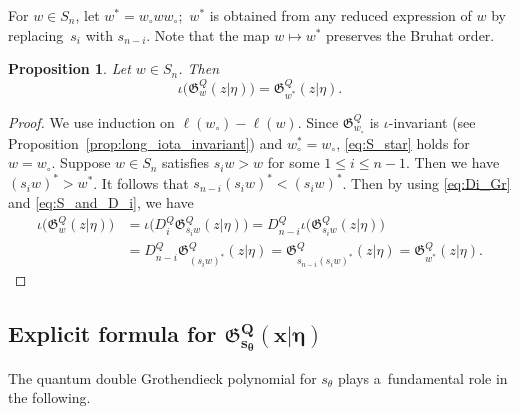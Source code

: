 \documentclass[pdftex]{sigma}
\numberwithin{equation}{section}
\newcommand{\Gro}[1]{\mathfrak{G}^Q_{#1}}
\newtheorem{Proposition}[Theorem]{Proposition}
\theoremstyle{definition}
\begin{document}
For $w\in S_n$, let
$w^*=w_\circ w w_\circ;$
$w^*$ is obtained from any
reduced expression of $w$ by replacing~$s_i$ with $s_{n-i}$.
Note that the map $w\mapsto w^*$ preserves the Bruhat order.
\begin{Proposition}\label{prop:S_star}
Let $w\in S_n$. Then
\begin{equation}
\iota\bigl(\Gro{w}(z|\eta)\bigr)=
\Gro{w^*}(z|\eta).
\label{eq:S_star}
\end{equation}
\end{Proposition}
\begin{proof}
We use induction on $\ell(w_\circ)-\ell(w)$.
Since $\Gro{w_\circ}$
is $\iota$-invariant (see Proposition~\ref{prop:long_iota_invariant})
and $w_\circ^*=w_\circ$, \eqref{eq:S_star} holds for $w=w_\circ$.
Suppose $w\in S_n$ satisfies
$s_iw>w$ for some $1\le i\le n-1$.
Then we have $(s_iw)^*>w^*$.
It follows that $s_{n-i}(s_iw)^*<(s_iw)^*$.
Then by using
\eqref{eq:Di_Gr} and
\eqref{eq:S_and_D_i}, we have
\begin{align*}
\iota\bigl(\Gro{w}(z|\eta)\bigr)&=
\iota\bigl(D_i^Q \Gro{s_iw}(z|\eta)\bigr)=D_{n-i}^Q \iota\bigl(\Gro{s_iw}(z|\eta)\bigr)\\
&=D_{n-i}^Q \Gro{(s_iw)^*}(z|\eta)=\Gro{s_{n-i}(s_iw)^*}(z|\eta)=\Gro{w^*}(z|\eta).\tag*{\qed}
\end{align*}\renewcommand{\qed}{}
\end{proof}

\subsection[Explicit formula for Gro\{s\_theta\}(x|eta)]{Explicit formula for $\boldsymbol{\Gro{s_\theta}(x|\eta)}$}
The quantum double Grothendieck polynomial for $s_\theta$ plays a~fundamental role
in the following.
\end{document}
